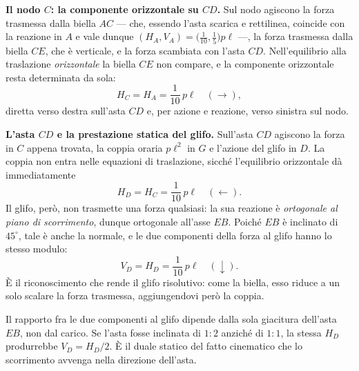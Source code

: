 \begin{esercizio}
\begin{svolgimento}
		



		
			\medskip\noindent\textbf{Il nodo $C$: la componente orizzontale su
			$CD$.}
		Sul nodo agiscono la forza trasmessa dalla biella $AC$ --- che, essendo
		l'asta scarica e rettilinea, coincide con la reazione in $A$ e vale
		dunque $(H_A, V_A) = \bigl(\tfrac{1}{10}, \tfrac{1}{5}\bigr) p\ell$
		---, la forza trasmessa dalla biella $CE$, che è verticale, e la
		forza scambiata con l'asta $CD$. Nell'equilibrio alla traslazione
		\emph{orizzontale} la biella $CE$ non compare, e la componente
		orizzontale resta determinata da sola:
		\[
		H_C = H_A = \frac{1}{10}\,p\ell \quad (\rightarrow) ,
		\]
		diretta verso destra sull'asta $CD$ e, per azione e reazione, verso
		sinistra sul nodo.
		
		\medskip\noindent\textbf{L'asta $CD$ e la prestazione statica del
			glifo.}
		Sull'asta $CD$ agiscono la forza in $C$ appena trovata, la coppia
		oraria $p\ell^{2}$ in $G$ e l'azione del glifo in $D$. La coppia non
		entra nelle equazioni di traslazione, sicché l'equilibrio orizzontale
		dà immediatamente
		\[
		H_D = H_C = \frac{1}{10}\,p\ell \quad (\leftarrow) .
		\]
		Il glifo, però, non trasmette una forza qualsiasi: la sua reazione è
		\emph{ortogonale al piano di scorrimento}, dunque ortogonale
		all'asse $EB$. Poiché $EB$ è inclinato di $45^{\circ}$, tale è anche
		la normale, e le due componenti della forza al glifo hanno lo stesso
		modulo:
		\begin{equation}
			\label{eq:anelloTA_glifo}
			V_D = H_D = \frac{1}{10}\,p\ell \quad (\downarrow) .
		\end{equation}
		È il riconoscimento che rende il glifo risolutivo: come la biella,
		esso riduce a un solo scalare la forza trasmessa, aggiungendovi però
		la coppia.
		
		\begin{oss}
			Il rapporto fra le due componenti al glifo dipende dalla sola
			giacitura dell'asta $EB$, non dal carico. Se l'asta fosse
			inclinata di $1:2$ anziché di $1:1$, la stessa $H_D$
			produrrebbe $V_D = H_D/2$. È il duale statico del fatto
			cinematico che lo scorrimento avvenga nella direzione dell'asta.
		\end{oss}
		

\end{svolgimento}
\end{esercizio}
